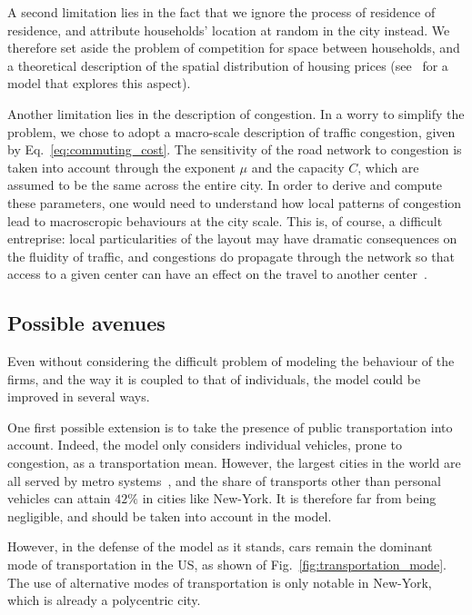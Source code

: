 A second limitation lies in the fact that we ignore the process of residence of
residence, and attribute households' location at random in the city instead. We
therefore set aside the problem of competition for space between households, and
a theoretical description of the spatial distribution of housing prices
(see~\cite{Gauvin:2013} for a model that explores this aspect).

Another limitation lies in the description of congestion. In a worry to
simplify the problem, we chose to adopt a macro-scale description of
traffic congestion, given by Eq.~\ref{eq:commuting_cost}. The sensitivity of the
road network to congestion is taken into account through the exponent $\mu$ and
the capacity $C$, which are assumed to be the same across the entire city. In
order to derive and compute these parameters, one would need to understand how local
patterns of congestion lead to macroscropic behaviours at the city scale. This
is, of course, a difficult entreprise:  local particularities of the layout may
have dramatic consequences on the fluidity of traffic, and congestions do
propagate through the network so that access to a given center can have an
effect on the travel to another center~\cite{Li:2015}. 

\subsection{Possible avenues}
\label{sub:possible_avenues}

Even without considering the difficult problem of modeling the behaviour of the
firms, and the way it is coupled to that of individuals, the model could be
improved in several ways. 

One first possible extension is to take the presence of public transportation
into account. Indeed, the model only considers individual vehicles, prone to
congestion, as a transportation mean.  However, the largest cities in the world
are all served by metro systems~\cite{Roth:2012}, and the share of transports
other than personal vehicles can attain $42\%$ in cities like New-York. It is therefore far from
being negligible, and should be taken into account in the model. 

However, in the defense of the model as it stands, cars remain the dominant mode
of transportation in the US, as shown of Fig.~\ref{fig:transportation_mode}. The
use of alternative modes of transportation is only notable in New-York, which is
already a polycentric city.\\

